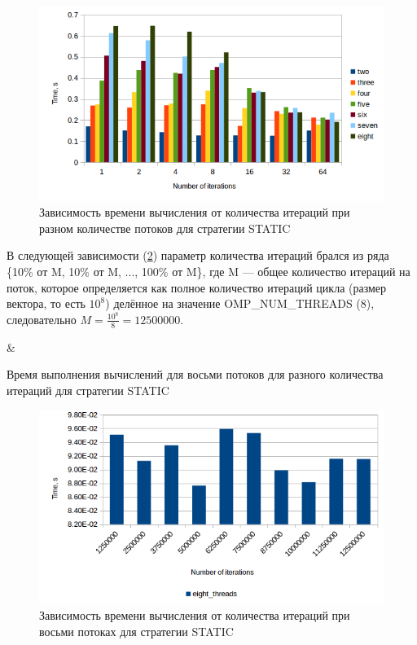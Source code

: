 \begin{figure}[h]
  \centering
  \includegraphics[width=.75\textwidth]{static.png}
  \caption{Зависимость времени вычисления от количества итераций при разном количестве потоков для стратегии STATIC}
\label{fig:static}
\end{figure}

В следующей зависимости (\ref{fig:staticm}) параметр количества итераций брался из ряда \{10\% от M, 10\% от M, ..., 100\% от M\}, где M --- общее количество итераций на поток, которое определяется как полное количество итераций цикла (размер вектора, то есть $10^8$) делённое на значение OMP\_NUM\_THREADS (8), следовательно $M = \frac{10^8}{8} = 12500000$.

\begin{table}[h]
  \centering
  {\iterations & \time}

  \caption{Время выполнения вычислений для восьми потоков для разного количества итераций для стратегии STATIC}
  \label{tab:staticm}
\end{table}

\begin{figure}[h]
  \centering
  \includegraphics[width=.75\textwidth]{static_m.png}
  \caption{Зависимость времени вычисления от количества итераций при восьми потоках для стратегии STATIC}
\label{fig:staticm}
\end{figure}

